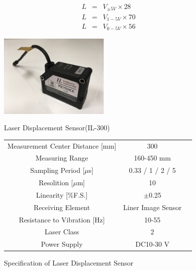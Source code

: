 \documentclass[a4paper,12pt]{article_vdlab_sotsuron}
\begin{document}
\begin{eqnarray}
 \label{eq:v5} L &=& V_{\pm5V} \times 28\\
 \label{eq:v15} L &=& V_{1-5V} \times 70\\
 \label{eq:v05} L &=& V_{0-5V} \times 56
\end{eqnarray}

\vspace*{10mm}
\begin{figure}[htp]
  \begin{minipage}{0.3\textwidth}
    \begin{center}
      \includegraphics[height=40mm]{figure/il_300.eps}
      \vspace*{3mm}
      \caption{Laser Displacement Sensor(IL-300)}
      \label{fig:il_300}
    \end{center}
  \end{minipage}
  \begin{minipage}{0.7\textwidth}
      \begin{center}
	\makeatletter
	\def\@captype{table}
	\makeatother
	\caption{Specification of Laser Displacement Sensor}
	\label{tab:il_300}
	\begin{tabular}{ccc}\hline
	  Measurement Center Distance [mm] & 300\\
	  Measuring Range & 160-450 mm\\
	  Sampling Period [$\mu$s]& 0.33 / 1 / 2 / 5\\
	  Resolition [$\mu$m] & 10\\
	  Linearity [\%F.S.] & $\pm$0.25\\
	  Receiving Element & Liner Image Sensor\\
	  Resistance to Vibration [Hz] & 10-55\\
	  Laser Class & 2\\
	  Power Supply & DC10-30 V\\\hline
	  \end{tabular}
	\end{center}
  \end{minipage}
\end{figure}
\end{document}
